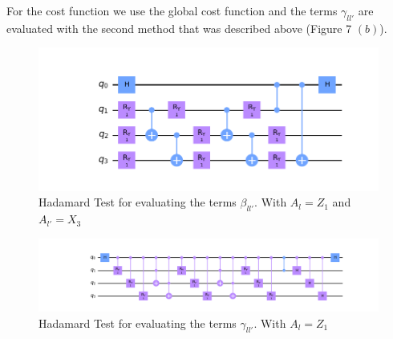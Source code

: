 \documentclass[12pt]{article}
\begin{document}
For the cost function we use the global cost function and the terms $\gamma_{ll'}$ are evaluated with the second method that was described above (Figure 7 $(b)$).
\begin{figure}[H]
    
    \centering
    \includegraphics[scale=0.6]{Figure_2.png}
   
    \caption{
        \justifying
        \centering
        Hadamard Test for evaluating the terms $\beta_{ll'}$. With $A_l = Z_1$ and $A_{l'} = X_3$}
\end{figure}    

\begin{figure}[H]
    
    \centering
    \includegraphics[scale=0.4]{Figure_3.png}
   
    \caption{
        \justifying
        \centering
        Hadamard Test for evaluating the terms $\gamma_{ll'}$. With $A_l = Z_1$ }
\end{figure} 
\end{document}
